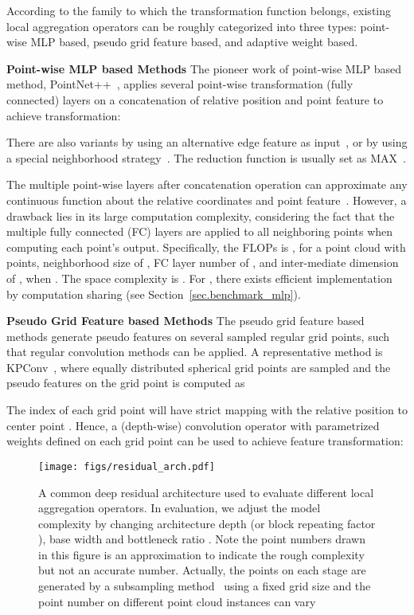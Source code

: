 \documentclass[runningheads]{llncs}
\begin{document}
According to the family to which the transformation function  belongs, existing local aggregation operators can be roughly categorized into three types: point-wise MLP based, pseudo grid feature based, and adaptive weight based.

\vspace{0.3em} \noindent \textbf{Point-wise MLP based Methods} The pioneer work of point-wise MLP based method, PointNet++~\cite{qi2017pointnet++}, applies several point-wise transformation (fully connected) layers on a concatenation of relative position and point feature to achieve transformation:

There are also variants by using an alternative edge feature  as input~\cite{wang2019dynamic,li2019can}, or by using a special neighborhood strategy~\cite{komarichev2019cnn}. The reduction function  is usually set as MAX~\cite{qi2017pointnet++,wang2019dynamic,li2019can}.

The multiple point-wise layers after concatenation operation can approximate any continuous function about the relative coordinates and point feature~\cite{qi2017pointnet,qi2017pointnet++}. However, a drawback lies in its large computation complexity, considering the fact that the multiple fully connected (FC) layers are applied to all neighboring points when computing each point's output. Specifically, the FLOPs is  , for a point cloud with  points, neighborhood size of , FC layer number of , and inter-mediate dimension of , when . The space complexity is . For , there exists efficient implementation by computation sharing (see Section~\ref{sec.benchmark_mlp}).

\vspace{0.3em} \noindent \textbf{Pseudo Grid Feature based Methods} The pseudo grid feature based methods generate pseudo features on several sampled regular grid points, such that regular convolution methods can be applied. A representative method is KPConv~\cite{thomas2019kpconv}, where equally distributed spherical grid points are sampled and the pseudo features on the  grid point is computed as

The index of each grid point  will have strict mapping with the relative position to center point . Hence, a (depth-wise) convolution operator with parametrized weights  defined on each grid point can be used to achieve feature transformation:


\begin{figure}[t]
    \centering
    \texttt{[image: figs/residual\_arch.pdf]}
    \vspace{-1.5em}
    \caption{A common deep residual architecture used to evaluate different local aggregation operators. In evaluation, we adjust the model complexity by changing architecture depth (or block repeating factor ), base width  and bottleneck ratio . Note the point numbers drawn in this figure is an approximation to indicate the rough complexity but not an accurate number. Actually, the points on each stage are generated by a subsampling method~\cite{Thomas_2018} using a fixed grid size and the point number on different point cloud instances can vary}
    \label{fig:arch}
    \vspace{-1.5em}
\end{figure}
\end{document}
